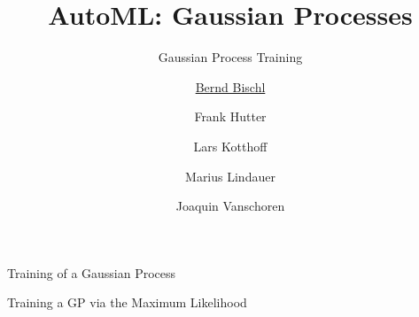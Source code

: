 



\newcommand{\lz}{\vspace{0.5cm}}
\newcommand{\thetab}{\bm{\weights}}
\newcommand{\zero}{\mathbf{0}}
\newcommand{\Xmat}{\mathbf{X}}
\newcommand{\ydat}{\mathbf{y}}
\newcommand{\id}{\boldsymbol{I}}
\newcommand{\Amat}{\mathbf{A}}
\newcommand{\Xspace}{\mathcal{X}}                                           
\newcommand{\Yspace}{\mathcal{Y}}
\newcommand{\ls}{\ell}
\newcommand{\natnum}{\mathbb{N}}
\newcommand{\intnum}{\mathbb{Z}}

\usepackage{fontawesome}
\usepackage{dirtytalk}
\usepackage{csquotes}




\title[AutoML: GPs]{AutoML: Gaussian Processes} %
\subtitle{Gaussian Process Training} %
\author[Marius Lindauer]{\underline{Bernd Bischl} \and Frank Hutter \and Lars Kotthoff\newline \and Marius Lindauer \and Joaquin Vanschoren}
\institute{}
\date{}




\maketitle
	


\begin{frame}[c]{Training of a Gaussian Process}



\end{frame}

\begin{frame}[c,allowframebreaks]{Training a GP via the Maximum Likelihood}



\framebreak



\end{frame}

